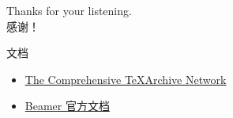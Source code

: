 \documentclass[10pt, mathserif]{beamer}
\begin{document}
	\begin{withoutheadline}
		\begin{frame}
			Thanks for your listening. \\
			感谢！
		\end{frame}
	\end{withoutheadline}

    \begin{frame}{文档}
        \begin{itemize}
            \item \href{https://www.ctan.org}{The Comprehensive \TeX Archive Network}
            \item \href{http://mirrors.ctan.org/macros/latex/contrib/beamer/doc/beameruserguide.pdf}%
                {Beamer 官方文档}
        \end{itemize}
    \end{frame}
\end{document}
